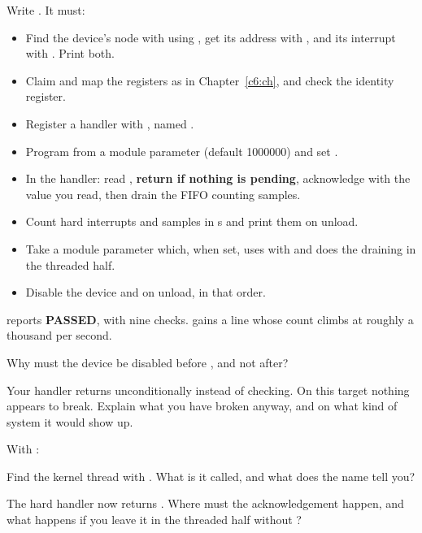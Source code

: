 Write . It must:
\begin{itemize}
  \item Find the device's node with  using
    , get its address with , and its
    interrupt with . Print both.
  \item Claim and map the registers as in Chapter~\ref{c6:ch}, and check the identity register.
  \item Register a handler with , named .
  \item Program  from a module parameter (default 1000000) and set .
  \item In the handler: read , \textbf{return  if nothing is
    pending}, acknowledge with the value you read, then drain the FIFO counting samples.
  \item Count hard interrupts and samples in s and print them on unload.
  \item Take a  module parameter which, when set, uses 
    with  and does the draining in the threaded half.
  \item Disable the device and  on unload, in that order.
\end{itemize}

\checkyourself {} reports \textbf{PASSED}, with nine checks.
 gains a  line whose count climbs at roughly a thousand per
second.

 Why must the device be disabled before , and not after?

 Your handler returns  unconditionally instead of checking. On this
target nothing appears to break. Explain what you have broken anyway, and on what kind of system it
would show up.

\label{c8:ex:7}

With :

 Find the kernel thread with . What is it called, and what does the name tell you?

 The hard handler now returns . Where must the acknowledgement
happen, and what happens if you leave it in the threaded half without ?

